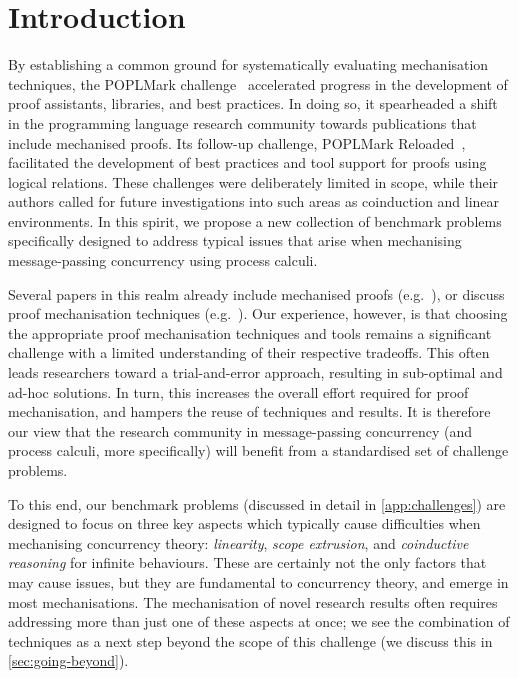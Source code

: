 \documentclass[runningheads]{llncs}
\begin{document}
\section{Introduction}
By establishing a common ground for systematically evaluating mechanisation techniques, 
the POPLMark challenge~\cite{POPLMark} accelerated progress in 
the development of proof assistants, libraries, and best practices. In doing so, it 
spearheaded a shift in the programming language research community towards 
publications that include mechanised proofs. 
Its follow-up challenge, POPLMark Reloaded~\cite{POPLMarkReloaded}, 
facilitated the development of best practices and tool support for proofs 
using logical relations. These challenges were deliberately limited in scope, 
while their authors called for future investigations into such areas as 
coinduction and linear environments. In this spirit, we propose a 
new collection of benchmark problems specifically designed to address typical 
issues that arise when mechanising message-passing concurrency using process 
calculi.

Several papers in this realm already include mechanised proofs
(e.g.~\cite{Castro-Perez2021,Castro2020,lmcs:9985,
  DBLP:journals/jar/CruzFilipeMP23, Tirore:2023}), or discuss proof mechanisation techniques
(e.g.~\cite{Bengtson2016, Gay2001,
  Thiemann2019, DBLP:conf/forte/ZalakainD21}).  Our
experience, however, is that choosing the appropriate proof mechanisation techniques and 
tools remains a significant challenge with a limited understanding of their 
respective tradeoffs.  This often leads researchers toward a trial-and-error approach, 
resulting in sub-optimal and ad-hoc solutions. In turn, this increases the overall effort 
required for proof mechanisation, and hampers the reuse of techniques and results.
%
It is therefore our view that the research community in message-passing
concurrency (and process calculi, more specifically) will benefit from a standardised set
of challenge problems.

To this end, our benchmark problems (discussed in detail in \cref{app:challenges}) are designed to focus on three key aspects which typically cause difficulties 
when mechanising concurrency theory: \emph{linearity}, \emph{scope extrusion}, 
and \emph{coinductive reasoning} for infinite behaviours. These are certainly not the only factors that may cause issues, but they
are fundamental to concurrency theory, and emerge in most mechanisations.
The mechanisation of novel research results often requires addressing more than
just one of these aspects at once; we see the combination of techniques
as a next step beyond the scope of this challenge (we discuss this in
\cref{sec:going-beyond}).
\end{document}
